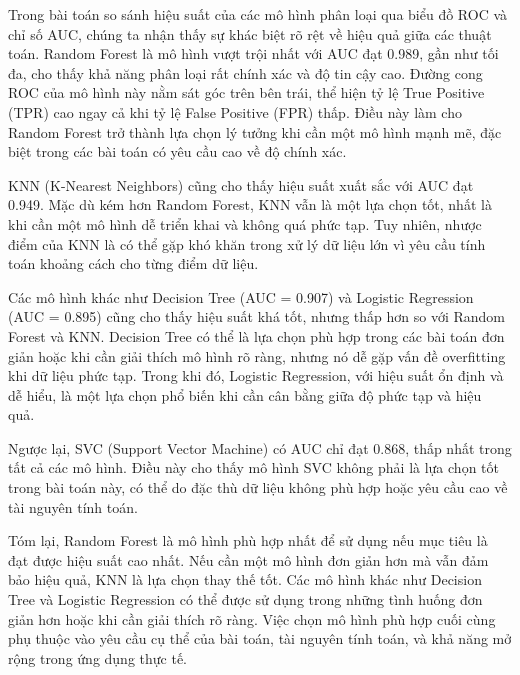 \documentclass[11pt]{article}
\begin{document}
	\hspace{0.6cm}Trong bài toán so sánh hiệu suất của các mô hình phân loại qua biểu đồ ROC và chỉ số AUC, chúng ta nhận thấy sự khác biệt rõ rệt về hiệu quả giữa các thuật toán. Random Forest là mô hình vượt trội nhất với AUC đạt 0.989, gần như tối đa, cho thấy khả năng phân loại rất chính xác và độ tin cậy cao. Đường cong ROC của mô hình này nằm sát góc trên bên trái, thể hiện tỷ lệ True Positive (TPR) cao ngay cả khi tỷ lệ False Positive (FPR) thấp. Điều này làm cho Random Forest trở thành lựa chọn lý tưởng khi cần một mô hình mạnh mẽ, đặc biệt trong các bài toán có yêu cầu cao về độ chính xác.
	\vspace{0.2cm}
	
	KNN (K-Nearest Neighbors) cũng cho thấy hiệu suất xuất sắc với AUC đạt 0.949. Mặc dù kém hơn Random Forest, KNN vẫn là một lựa chọn tốt, nhất là khi cần một mô hình dễ triển khai và không quá phức tạp. Tuy nhiên, nhược điểm của KNN là có thể gặp khó khăn trong xử lý dữ liệu lớn vì yêu cầu tính toán khoảng cách cho từng điểm dữ liệu.
	\vspace{0.2cm}
	
	Các mô hình khác như Decision Tree (AUC = 0.907) và Logistic Regression (AUC = 0.895) cũng cho thấy hiệu suất khá tốt, nhưng thấp hơn so với Random Forest và KNN. Decision Tree có thể là lựa chọn phù hợp trong các bài toán đơn giản hoặc khi cần giải thích mô hình rõ ràng, nhưng nó dễ gặp vấn đề overfitting khi dữ liệu phức tạp. Trong khi đó, Logistic Regression, với hiệu suất ổn định và dễ hiểu, là một lựa chọn phổ biến khi cần cân bằng giữa độ phức tạp và hiệu quả.
	\vspace{0.2cm}
	
	Ngược lại, SVC (Support Vector Machine) có AUC chỉ đạt 0.868, thấp nhất trong tất cả các mô hình. Điều này cho thấy mô hình SVC không phải là lựa chọn tốt trong bài toán này, có thể do đặc thù dữ liệu không phù hợp hoặc yêu cầu cao về tài nguyên tính toán.
	\vspace{0.2cm}
	
	Tóm lại, Random Forest là mô hình phù hợp nhất để sử dụng nếu mục tiêu là đạt được hiệu suất cao nhất. Nếu cần một mô hình đơn giản hơn mà vẫn đảm bảo hiệu quả, KNN là lựa chọn thay thế tốt. Các mô hình khác như Decision Tree và Logistic Regression có thể được sử dụng trong những tình huống đơn giản hơn hoặc khi cần giải thích rõ ràng. Việc chọn mô hình phù hợp cuối cùng phụ thuộc vào yêu cầu cụ thể của bài toán, tài nguyên tính toán, và khả năng mở rộng trong ứng dụng thực tế.
		
\end{document}
